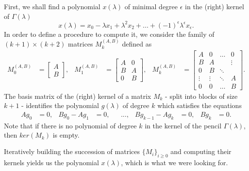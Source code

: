 First, we shall find a polynomial \(x(\lambda)\) of minimal degree \(\epsilon\) in the (right) kernel
of \(\Gamma(\lambda)\)
\[
    x(\lambda) = x_{0} - \lambda x_{1} + \lambda^2 x_{2} + ... + (-1)^\epsilon \lambda^\epsilon x_{\epsilon}.
\]
In order to define a procedure to compute it, we consider the family of \((k+1) \times (k+2)\) matrices
\(M_{k}^{(A, B)}\) defined as
\begin{align*}
    M_{0}^{(A, B)} &=
        \begin{bmatrix}
            A \\
            B
        \end{bmatrix},
    & M_{1}^{(A, B)} &=
        \begin{bmatrix}
            A & 0 \\
            B & A \\
            0 & B
        \end{bmatrix},
    & M_{k}^{(A, B)} &=
        \begin{bmatrix}
            A & 0 & \hdots &    0   \\
            B & A &        & \vdots \\
            0 & B & \ddots & \\
            \vdots & \vdots & \ddots & A \\
            0      &    0   & \hdots & B
        \end{bmatrix}.
\end{align*}
The basis matrix of the (right) kernel of a matrix \(M_{k}\) - split into blocks of size \(k+1\) - identifies
the polynomial \(g(\lambda)\) of degree \(k\) which satisfies the equations
\begin{align*}
   Ag_{0} &= 0, &
   Bg_{0} - Ag_{1} &= 0, &
   & ..., &
   Bg_{k-1} - Ag_{k} &= 0, &
   Bg_{k} &= 0.
\end{align*}
Note that if there is no polynomial of degree \(k\) in the kernel of the pencil
\(\Gamma(\lambda)\), then \(ker(M_{k})\) is empty.

Iteratively building the succession of matrices \(\{M_{i}\}_{i \geq 0}\) and computing their kernels
yields us the polynomial \(x(\lambda)\), which is what we were looking for.

